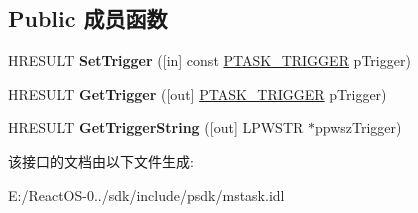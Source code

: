 \subsection*{Public 成员函数}
\begin{DoxyCompactItemize}
\item 
\mbox{\label{interface_i_task_trigger_a0d53a49a8badbd5f86cb6bf51fe7927b}} 
H\+R\+E\+S\+U\+LT {\bfseries Set\+Trigger} (\mbox{[}in\mbox{]} const \hyperlink{struct_i_task_trigger_1_1___t_a_s_k___t_r_i_g_g_e_r}{P\+T\+A\+S\+K\+\_\+\+T\+R\+I\+G\+G\+ER} p\+Trigger)
\item 
\mbox{\label{interface_i_task_trigger_adcd380d7bd75f5ade28135e7dd901f53}} 
H\+R\+E\+S\+U\+LT {\bfseries Get\+Trigger} (\mbox{[}out\mbox{]} \hyperlink{struct_i_task_trigger_1_1___t_a_s_k___t_r_i_g_g_e_r}{P\+T\+A\+S\+K\+\_\+\+T\+R\+I\+G\+G\+ER} p\+Trigger)
\item 
\mbox{\label{interface_i_task_trigger_ae71a505c02763136a994e72116f4523a}} 
H\+R\+E\+S\+U\+LT {\bfseries Get\+Trigger\+String} (\mbox{[}out\mbox{]} L\+P\+W\+S\+TR $\ast$ppwsz\+Trigger)
\end{DoxyCompactItemize}


该接口的文档由以下文件生成\+:\begin{DoxyCompactItemize}
\item 
E\+:/\+React\+O\+S-\/0../sdk/include/psdk/mstask.\+idl\end{DoxyCompactItemize}
